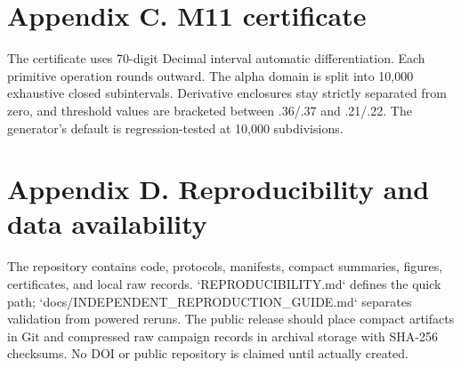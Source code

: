 \documentclass[11pt]{article}
\begin{document}
\section{Appendix C. M11 certificate}
The certificate uses 70-digit Decimal interval automatic differentiation. Each primitive operation rounds outward. The alpha domain is split into 10,000 exhaustive closed subintervals. Derivative enclosures stay strictly separated from zero, and threshold values are bracketed between .36/.37 and .21/.22. The generator's default is regression-tested at 10,000 subdivisions.

\section{Appendix D. Reproducibility and data availability}
The repository contains code, protocols, manifests, compact summaries, figures, certificates, and local raw records. `REPRODUCIBILITY.md` defines the quick path; `docs/INDEPENDENT_REPRODUCTION_GUIDE.md` separates validation from powered reruns. The public release should place compact artifacts in Git and compressed raw campaign records in archival storage with SHA-256 checksums. No DOI or public repository is claimed until actually created.
\end{document}
